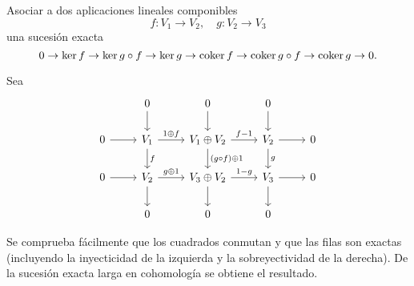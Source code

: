 \documentclass[twoside]{article}
\begin{document}
\newpage

\begin{ejercicio}{4.5}
Asociar a dos aplicaciones lineales componibles 
\[
f:V_1\to V_2,\quad g:V_2\to V_3
\]
una sucesión exacta
\[
0\to \ker{f}\to\ker{g\circ f}\to\ker{g}\to\operatorname{coker}{f}\to\operatorname{coker}{g\circ f}\to\operatorname{coker}{g}\to 0.
\]
\end{ejercicio}
\begin{solucion}
Sea
\[
\begin{tikzcd}
& 0\arrow[d] & 0 \arrow[d] & 0\arrow[d]&\\
0\arrow[r] & V_1\arrow[d,"f"]\arrow[r,"1\oplus f"] & V_1\oplus V_2\arrow[r, "f-1"] \arrow[d, "(g\circ f)\oplus 1"]& V_2 \arrow[d,"g"]\arrow[r] & 0\\
0\arrow[r] &V_2\arrow[d]\arrow[r, "g\oplus 1"]& V_3\oplus V_2\arrow[d] \arrow[r, "1-g"]& V_3\arrow[d]\arrow[r] & 0\\
& 0 & 0 & 0 &
\end{tikzcd}
\]

Se comprueba fácilmente que los cuadrados conmutan y que las filas son exactas (incluyendo la inyecticidad de la izquierda y la sobreyectividad de la derecha). De la sucesión exacta larga en cohomología se obtiene el resultado.
\end{solucion}
\end{document}
